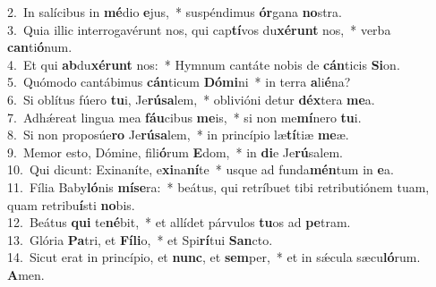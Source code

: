 {2.~}In salícibus in \textbf{mé}dio \textbf{e}jus,~* suspéndimus \textbf{ór}gana \textbf{no}stra.\\
{3.~}Quia illic interrogavérunt nos, qui cap\textbf{tí}vos du\textbf{xé}\textbf{runt} nos,~* verba \textbf{can}ti\textbf{ó}num.\\
{4.~}Et qui \textbf{ab}du\textbf{xé}\textbf{runt} nos:~* Hymnum cantáte nobis de \textbf{cán}ticis \textbf{Si}on.\\
{5.~}Quómodo cantábimus \textbf{cán}ticum \textbf{Dó}\textbf{mi}ni~* in terra \textbf{a}li\textbf{é}na?\\
{6.~}Si oblítus fúero \textbf{tu}i, Je\textbf{rú}\textbf{sa}lem,~* oblivióni detur \textbf{déx}tera \textbf{me}a.\\
{7.~}Adhǽreat lingua mea \textbf{fáu}cibus \textbf{me}is,~* si non me\textbf{mí}nero \textbf{tu}i.\\
{8.~}Si non proposúe\textbf{ro} Je\textbf{rú}\textbf{sa}lem,~* in princípio læ\textbf{tí}tiæ \textbf{me}æ.\\
{9.~}Memor esto, Dómine, fili\textbf{ó}rum \textbf{E}dom,~* in \textbf{di}e Je\textbf{rú}salem.\\
{10.~}Qui dicunt: Exinaníte, e\textbf{xi}na\textbf{ní}te~* usque ad funda\textbf{mén}tum in \textbf{e}a.\\
{11.~}Fília Baby\textbf{ló}nis \textbf{mí}\textbf{se}ra:~* beátus, qui retríbuet tibi retributiónem tuam, quam retribu\textbf{í}sti \textbf{no}bis.\\
{12.~}Beátus \textbf{qui} te\textbf{né}bit,~* et allídet párvulos \textbf{tu}os ad \textbf{pe}tram.\\
{13.~}Glória \textbf{Pa}tri, et \textbf{Fí}\textbf{li}o,~* et Spi\textbf{rí}tui \textbf{San}cto.\\
{14.~}Sicut erat in princípio, et \textbf{nunc}, et \textbf{sem}per,~* et in sǽcula sæcu\textbf{ló}rum. \textbf{A}men.\\
